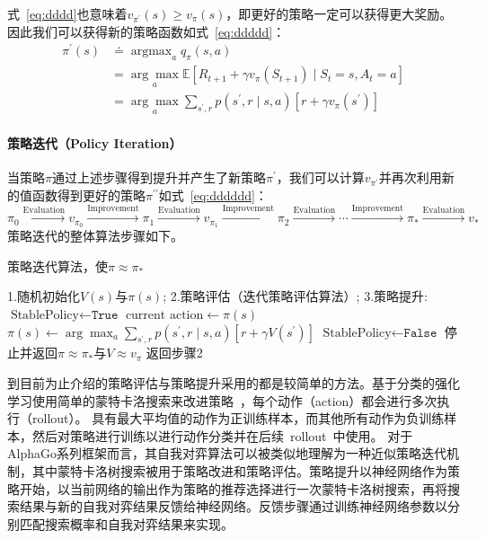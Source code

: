 式~\ref{eq:dddd}也意味着$v_{\pi^{\prime}}(s) \geq v_{\pi}(s)$，即更好的策略一定可以获得更大奖励。因此我们可以获得新的策略函数如式~\ref{eq:ddddd}：
\begin{equation}
  \begin{aligned}
  \pi^{\prime}(s) & \doteq \mathop{\arg \max }_a q_{\pi}(s, a) \\
  &=\underset{a}{\arg \max } \mathbb{E}\left[R_{t+1}+\gamma v_{\pi}\left(S_{t+1}\right) \mid S_{t}=s, A_{t}=a\right] \\
  &=\underset{a}{\arg \max } \sum_{s^{\prime}, r} p\left(s^{\prime}, r \mid s, a\right)\left[r+\gamma v_{\pi}\left(s^{\prime}\right)\right]
  \end{aligned}
  \label{eq:ddddd}
\end{equation}

\paragraph{策略迭代（Policy Iteration）}
当策略$\pi$通过上述步骤得到提升并产生了新策略$\pi^{\prime}$，我们可以计算$v_{\pi^{\prime}}$并再次利用新的值函数得到更好的策略$\pi^{\prime\prime}$如式~\ref{eq:dddddd}：
\begin{equation}
  \pi_{0} \stackrel{\mathrm{Evaluation}}{\longrightarrow} v_{\pi_{0}} \stackrel{\mathrm{Improvement}}{\longrightarrow} \pi_{1} \stackrel{\mathrm{Evaluation}}{\longrightarrow} v_{\pi_{1}} \stackrel{\mathrm{Improvement}}{\longrightarrow} \pi_{2} \stackrel{\mathrm{Evaluation}}{\longrightarrow} \cdots \stackrel{\mathrm{Improvement}}{\longrightarrow} \pi_{*} \stackrel{\mathrm{Evaluation}}{\longrightarrow} v_{*}
  \label{eq:dddddd}
\end{equation}
策略迭代的整体算法步骤如下。
\begin{algorithm}[H]
  \caption{策略迭代算法，使$\pi \approx \pi_{*} $}
  \begin{algorithmic}
    \State 1.随机初始化$V(s)$与$\pi(s)$;
    \State 2.策略评估（迭代策略评估算法）;
    \State 3.策略提升:
    \State $\text{StablePolicy} \leftarrow \texttt{True}$
    \State $\text{current action}\leftarrow\pi(s)$
    \State $\pi(s) \leftarrow \arg \max _{a} \sum_{s^{\prime}, r} p\left(s^{\prime}, r \mid s, a\right)\left[r+\gamma V\left(s^{\prime}\right)\right]$
        \State $\text{StablePolicy} \leftarrow \texttt{False}$
    \EndIf
    \EndFor
    \State 停止并返回$\pi \approx \pi_{*} $与$V\approx v_{\pi} $
    \Else 
    \State 返回步骤2
    \EndIf
  \end{algorithmic}
\end{algorithm}
到目前为止介绍的策略评估与策略提升采用的都是较简单的方法。基于分类的强化学习使用简单的蒙特卡洛搜索来改进策略~\cite{RLC}，每个动作（action）都会进行多次执行（rollout）。 具有最大平均值的动作为正训练样本，而其他所有动作为负训练样本，然后对策略进行训练以进行动作分类并在后续~rollout~中使用。
对于AlphaGo系列框架而言，其自我对弈算法可以被类似地理解为一种近似策略迭代机制，其中蒙特卡洛树搜索被用于策略改进和策略评估。策略提升以神经网络作为策略开始，以当前网络的输出作为策略的推荐选择进行一次蒙特卡洛树搜索，再将搜索结果与新的自我对弈结果反馈给神经网络。反馈步骤通过训练神经网络参数以分别匹配搜索概率和自我对弈结果来实现。
